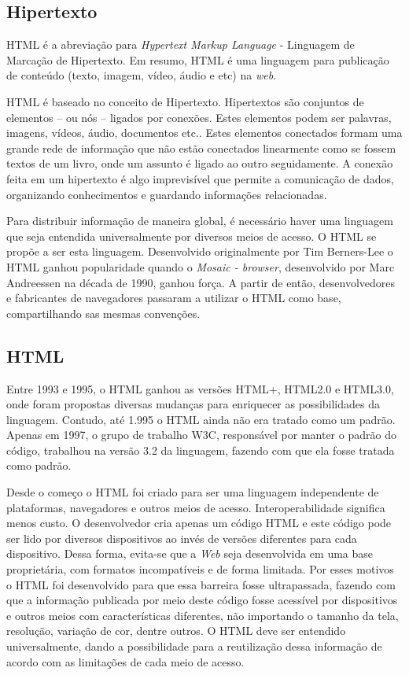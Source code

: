 \subsection{Hipertexto}

HTML é a abreviação para \textit{Hypertext Markup Language} - Linguagem de 
Marcação de Hipertexto. Em resumo, HTML é uma linguagem para publicação de 
conteúdo (texto, imagem, vídeo, áudio e etc) na \textit{web}.

HTML é baseado no conceito de Hipertexto. Hipertextos são conjuntos de 
elementos – ou nós – ligados por conexões. Estes elementos podem ser palavras, 
imagens, vídeos, áudio, documentos etc.. Estes elementos conectados formam uma 
grande rede de informação que não estão conectados linearmente como se fossem 
textos de um livro, onde um assunto é ligado ao outro seguidamente. A conexão 
feita em um hipertexto é algo imprevisível que permite a comunicação de dados, 
organizando conhecimentos e guardando informações relacionadas.

Para distribuir informação de maneira global, é necessário haver uma linguagem 
que seja entendida universalmente por diversos meios de acesso. O HTML se 
propõe a ser esta linguagem. Desenvolvido originalmente por Tim Berners-Lee o 
HTML ganhou popularidade quando o \textit{Mosaic - browser}, desenvolvido por 
Marc Andreessen na década de 1990, ganhou força. A partir de então, 
desenvolvedores e fabricantes de navegadores passaram a utilizar o HTML como 
base, compartilhando sas mesmas convenções.

\subsection{HTML}

Entre 1993 e 1995, o HTML ganhou as versões HTML+, HTML2.0 e HTML3.0, onde 
foram propostas diversas mudanças para enriquecer as possibilidades da 
linguagem. Contudo, até 1.995 o HTML ainda não era tratado como um padrão. 
Apenas em 1997, o grupo de trabalho W3C, responsável por manter o padrão do 
código, trabalhou na versão 3.2 da linguagem, fazendo com que ela fosse tratada 
como padrão.

Desde o começo o HTML foi criado para ser uma linguagem independente de 
plataformas, navegadores e outros meios de acesso. Interoperabilidade significa 
menos custo. O desenvolvedor cria apenas um código HTML e este código pode ser 
lido por diversos dispositivos ao invés de versões diferentes para cada 
dispositivo. Dessa forma, evita-se que a \textit{Web} seja desenvolvida em uma 
base proprietária, com formatos incompatíveis e de forma limitada. Por esses 
motivos o HTML foi desenvolvido para que essa barreira fosse ultrapassada, 
fazendo com que a informação publicada por meio deste código fosse acessível 
por dispositivos e outros meios com características diferentes, não importando 
o tamanho da tela, resolução, variação de cor, dentre outros. O HTML deve ser 
entendido universalmente, dando a possibilidade para a reutilização dessa 
informação de acordo com as limitações de cada meio de acesso.

